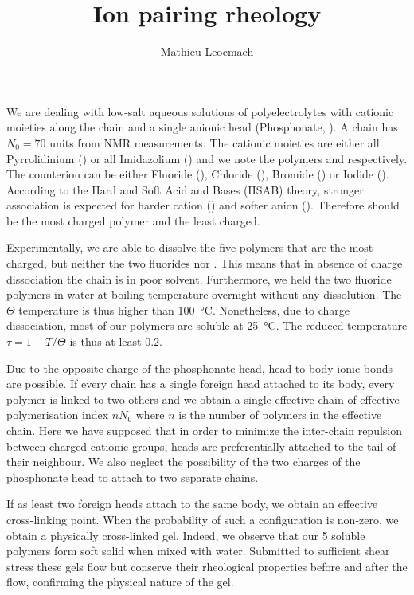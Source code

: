 \documentclass[12pt,a4paper]{article}
\author{Mathieu Leocmach}
\title{Ion pairing rheology}
\begin{document}
\maketitle

We are dealing with low-salt aqueous solutions of polyelectrolytes with cationic moieties along the chain and a single anionic head (Phosphonate, ). A chain has $N_0 = 70$ units from NMR measurements. The cationic moieties are either all Pyrrolidinium () or all Imidazolium () and we note the polymers  and  respectively. The counterion  can be either Fluoride (), Chloride (), Bromide () or Iodide (). According to the Hard and Soft Acid and Bases (HSAB) theory, stronger association is expected for harder cation () and softer anion (). Therefore  should be the most charged polymer and  the least charged.

Experimentally, we are able to dissolve the five polymers that are the most charged, but neither the two fluorides nor . This means that in absence of charge dissociation the chain is in poor solvent. Furthermore, we held the two fluoride polymers in water at boiling temperature overnight without any dissolution. The $\Theta$ temperature is thus higher than \SI{100}{\celsius}. Nonetheless, due to charge dissociation, most of our polymers are soluble at \SI{25}{\celsius}. The reduced temperature $\tau = 1 - T/\Theta$ is thus at least 0.2.

Due to the opposite charge of the phosphonate head, head-to-body ionic bonds are possible. If every chain has a single foreign head attached to its body, every polymer is linked to two others and we obtain a single effective chain of effective polymerisation index $n N_0$ where $n$ is the number of polymers in the effective chain. Here we have supposed that in order to minimize the inter-chain repulsion between charged cationic groups, heads are preferentially attached to the tail of their neighbour. We also neglect the possibility of the two charges of the phosphonate head to attach to two separate chains.

If as least two foreign heads attach to the same body, we obtain an effective cross-linking point. When the probability of such a configuration is non-zero, we obtain a physically cross-linked gel. Indeed, we observe that our 5 soluble polymers form soft solid when mixed with water. Submitted to sufficient shear stress these gels flow but conserve their rheological properties before and after the flow, confirming the physical nature of the gel.
\end{document}
